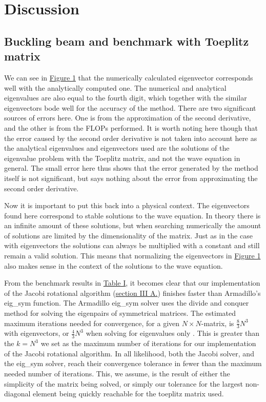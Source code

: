 \documentclass[reprint,english,notitlepage]{revtex4-1}  %
\begin{document}
\newpage

\section{Discussion} \label{sec:V} 

\subsection{Buckling beam and benchmark with Toeplitz matrix} \label{sec:V:a}

We can see in \hyperref[fig:IV:a:1]{Figure 1} that the numerically calculated eigenvector corresponds well with the analytically computed one. The numerical and analytical eigenvalues are also equal to the fourth digit, which together with the similar eigenvectors bode well for the accuracy of the method. There are two significant sources of errors here. One is from the approximation of the second derivative, and the other is from the FLOPs performed. It is worth noting here though that the error caused by the second order derivative is not taken into account here as the analytical eigenvalues and eigenvectors used are the solutions of the eigenvalue problem with the Toeplitz matrix, and not the wave equation in general. The small error here thus shows that the error generated by the method itself is not significant, but says nothing about the error from approximating the second order derivative.

Now it is important to put this back into a physical context. The eigenvectors found here correspond to stable solutions to the wave equation. In theory there is an infinite amount of these solutions, but when searching numerically the amount of solutions are limited by the dimensionality of the matrix. Just as in the case with eigenvectors the solutions can always be multiplied with a constant and still remain a valid solution. This means that normalizing the eigenvectors in \hyperref[fig:IV:a:1]{Figure 1} also makes sense in the context of the solutions to the wave equation.

From the benchmark results in \hyperref[table:IV:a:1]{Table I}, it becomes clear that our implementation of the Jacobi rotational algorithm (\hyperref[sec:III:a]{section III A.}) finishes faster than Armadillo's eig\_sym function. The Armadillo eig\_sym solver uses the divide and conquer method \citep{Armadillo} for solving the eigenpairs of symmetrical matrices. The estimated maximum iterations needed for convergence, for a given \(N\times N\)-matrix, is \(\frac{8}{3}N^{3}\) with eigenvectors, or \(\frac{4}{3}N^{3}\) when solving for eigenvalues only \citep{Cuppen}. This is greater than the \(k=N^{3}\) we set as the maximum number of iterations for our implementation of the Jacobi rotational algorithm. In all likelihood, both the Jacobi solver, and the eig\_sym solver, reach their convergence tolerance in fewer than the maximum needed number of iterations. This, we assume, is the result of either the simplicity of the matrix being solved, or simply our tolerance for the largest non-diagonal element being quickly reachable for the toeplitz matrix used.
\end{document}
